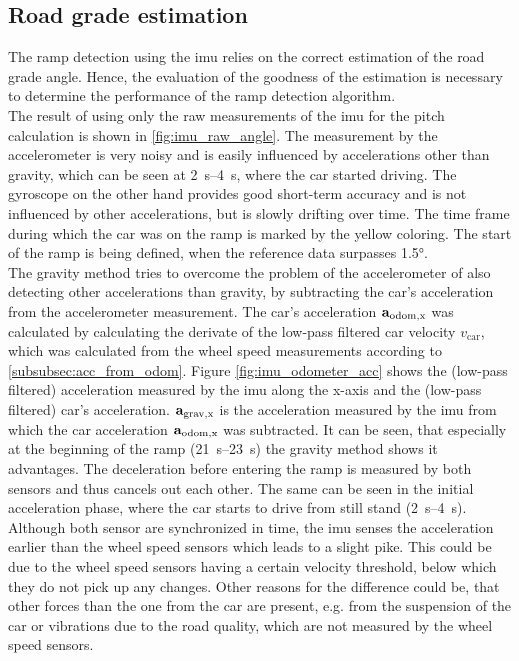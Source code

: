 \subsection{Road grade estimation}
The ramp detection using the \gls{imu} relies on the correct estimation of the road grade angle.
Hence, the evaluation of the goodness of the estimation is necessary to determine the performance of the ramp detection algorithm.\\
The result of using only the raw measurements of the \gls{imu} for the pitch calculation is shown in \cref{fig:imu_raw_angle}.
The measurement by the accelerometer is very noisy and is easily influenced by accelerations other than gravity, which can be seen at \SIrange{2}{4}{\second}, where the car started driving.
The gyroscope on the other hand provides good short-term accuracy and is not influenced by other accelerations, but is slowly drifting over time.
The time frame during which the car was on the ramp is marked by the yellow coloring.
The start of the ramp is being defined, when the reference data surpasses \ang{1.5}.\\
The gravity method tries to overcome the problem of the accelerometer of also detecting other accelerations than gravity, by subtracting the car's acceleration from the accelerometer measurement.
The car's acceleration $\vb{a}_\mathrm{odom,x} $ was calculated by calculating the derivate of the low-pass filtered car velocity $v_\mathrm{car} $, which was calculated from the wheel speed measurements according to \cref{subsubsec:acc_from_odom}.
Figure \ref{fig:imu_odometer_acc} shows the (low-pass filtered) acceleration measured by the \gls{imu} along the x-axis and the (low-pass filtered) car's acceleration.
$\vb{a}_\mathrm{grav,x} $ is the acceleration measured by the \gls{imu} from which the car acceleration $\vb{a}_\mathrm{odom,x} $ was subtracted.
It can be seen, that especially at the beginning of the ramp (\SIrange{21}{23}{\second}) the gravity method shows it advantages.
The deceleration before entering the ramp is measured by both sensors and thus cancels out each other.
The same can be seen in the initial acceleration phase, where the car starts to drive from still stand (\SIrange[]{2}{4}{\second}).
Although both sensor are synchronized in time, the \gls{imu} senses the acceleration earlier than the wheel speed sensors which leads to a slight pike.
This could be due to the wheel speed sensors having a certain velocity threshold, below which they do not pick up any changes.
Other reasons for the difference could be, that other forces than the one from the car are present, e.g. from the suspension of the car or vibrations due to the road quality, which are not measured by the wheel speed sensors.
